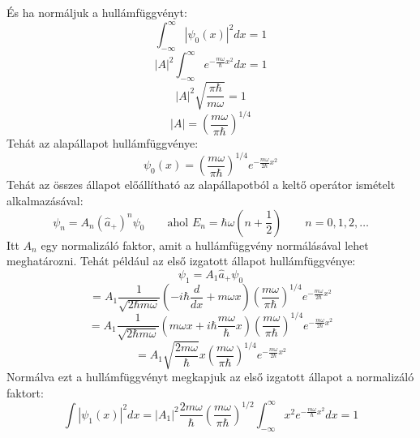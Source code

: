 \documentclass[a4paper,12pt]{article}
\begin{document}
És ha normáljuk a hullámfüggvényt:
\begin{equation}
    \int_{-\infty}^{\infty} |\psi_0(x)|^2 dx = 1
\end{equation}
\begin{equation}
    |A|^2 \int_{-\infty}^{\infty} e^{- \frac{m \omega}{\hbar} x^2} dx = 1
\end{equation}
\begin{equation}
    |A|^2 \sqrt{\frac{\pi \hbar}{m \omega}} = 1
\end{equation}
\begin{equation}
    |A| = \left( \frac{m \omega}{\pi \hbar} \right)^{1/4}
\end{equation}
Tehát az alapállapot hullámfüggvénye:
\begin{equation}
    \psi_0(x) = \left( \frac{m \omega}{\pi \hbar} \right)^{1/4} e^{- \frac{m \omega}{2 \hbar} x^2}
\end{equation}
Tehát az összes állapot előállítható az alapállapotból a keltő operátor ismételt alkalmazásával:
\begin{equation}
    \psi_n = A_n (\hat{a}_+)^n \psi_0 \quad \quad \text{ahol }  E_n = \hbar \omega \left( n + \frac{1}{2} \right) \quad \quad n = 0, 1, 2, \ldots
\end{equation}
Itt $A_n$ egy normalizáló faktor, amit a hullámfüggvény normálásával lehet meghatározni. Tehát például az első izgatott állapot hullámfüggvénye:
\begin{equation}
    \psi_1 = A_1 \hat{a}_+ \psi_0
\end{equation}
\begin{equation}
    = A_1 \frac{1}{\sqrt{2 \hbar m \omega}} \left( - i \hbar \frac{d}{dx} + m \omega x \right) \left( \frac{m \omega}{\pi \hbar} \right)^{1/4} e^{- \frac{m \omega}{2 \hbar} x^2}
\end{equation}
\begin{equation}
    = A_1 \frac{1}{\sqrt{2 \hbar m \omega}} \left( m \omega x + i \hbar \frac{m \omega}{\hbar} x \right) \left( \frac{m \omega}{\pi \hbar} \right)^{1/4} e^{- \frac{m \omega}{2 \hbar} x^2}
\end{equation}
\begin{equation}
    = A_1 \sqrt{\frac{2 m \omega}{\hbar}} x \left( \frac{m \omega}{\pi \hbar} \right)^{1/4} e^{- \frac{m \omega}{2 \hbar} x^2}
\end{equation}
Normálva ezt a hullámfüggvényt megkapjuk az első izgatott állapot a normalizáló faktort:
\begin{equation}
    \int |\psi_1(x)|^2 dx = |A_1|^2 \frac{2 m \omega}{\hbar} \left( \frac{m \omega}{\pi \hbar} \right)^{1/2} \int_{-\infty}^{\infty} x^2 e^{- \frac{m \omega}{\hbar} x^2} dx = 1
\end{equation}
\end{document}
